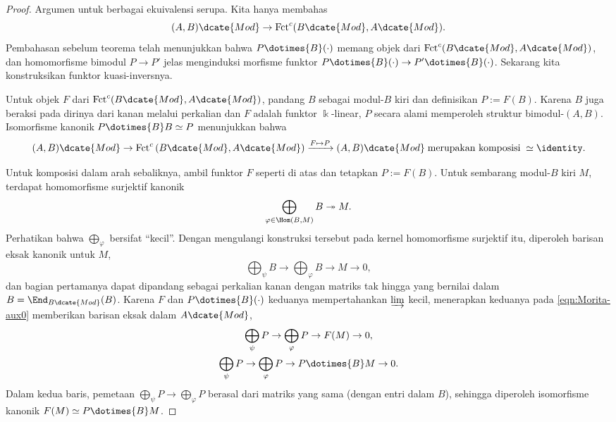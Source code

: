 \begin{proof}
	Argumen untuk berbagai ekuivalensi serupa. Kita hanya membahas
	\[ (A, B)\dcate{Mod} \to \mathrm{Fct}^c(B\dcate{Mod}, A\dcate{Mod}). \]
	Pembahasan sebelum teorema telah menunjukkan bahwa
	$P\dotimes{B}(\mathord\cdot)$ memang objek dari
	$\mathrm{Fct}^c(B\dcate{Mod},A\dcate{Mod})$, dan homomorfisme bimodul
	$P\to P'$ jelas menginduksi morfisme funktor
	$P\dotimes{B}(\mathord\cdot)\to P'\dotimes{B}(\mathord\cdot)$. Sekarang
	kita konstruksikan funktor kuasi-inversnya.

	Untuk objek $F$ dari
	$\mathrm{Fct}^c(B\dcate{Mod},A\dcate{Mod})$, pandang $B$ sebagai modul-$B$
	kiri dan definisikan $P:=F(B)$. Karena $B$ juga beraksi pada dirinya dari
	kanan melalui perkalian dan $F$ adalah funktor $\Bbbk$-linear, $P$ secara
	alami memperoleh struktur bimodul-$(A,B)$. Isomorfisme kanonik
	$P\dotimes{B}B\simeq P$ menunjukkan bahwa
	\[ (A, B)\dcate{Mod} \to \mathrm{Fct}^c\left(B\dcate{Mod}, A\dcate{Mod} \right) \xrightarrow{F \mapsto P} (A, B)\dcate{Mod} \;\text{merupakan komposisi}\; \simeq \identity. \]

	Untuk komposisi dalam arah sebaliknya, ambil funktor $F$ seperti di atas
	dan tetapkan $P:=F(B)$. Untuk sembarang modul-$B$ kiri $M$, terdapat
	homomorfisme surjektif kanonik
	\[ \bigoplus_{\varphi \in \Hom(B, M)} B \twoheadrightarrow M. \]
	Perhatikan bahwa $\bigoplus_\varphi$ bersifat ``kecil''. Dengan mengulangi
	konstruksi tersebut pada kernel homomorfisme surjektif itu, diperoleh
	barisan eksak kanonik untuk $M$,
	\begin{equation}\label{eqn:Morita-aux0}
		\bigoplus_\psi B \to \bigoplus_\varphi B \to M \to 0,
	\end{equation}
	dan bagian pertamanya dapat dipandang sebagai perkalian kanan dengan
	matriks tak hingga yang bernilai dalam
	$B=\End_{B\dcate{Mod}}(B)$. Karena $F$ dan
	$P\dotimes{B}(\mathord\cdot)$ keduanya mempertahankan $\varinjlim$ kecil,
	menerapkan keduanya pada \eqref{eqn:Morita-aux0} memberikan barisan eksak
	dalam $A\dcate{Mod}$,
	\begin{gather*}
		\bigoplus_\psi P \to \bigoplus_\varphi P \to F(M) \to 0, \\
		\bigoplus_\psi P \to \bigoplus_\varphi P \to P \dotimes{B} M \to 0.
	\end{gather*}
	Dalam kedua baris, pemetaan
	$\bigoplus_\psi P\to\bigoplus_\varphi P$ berasal dari matriks yang sama
	(dengan entri dalam $B$), sehingga diperoleh isomorfisme kanonik
	$F(M)\simeq P\dotimes{B}M$.


\end{proof}
